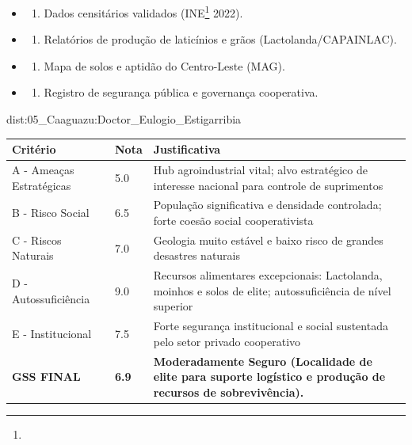 {\begin{itemize}
\tightlist
\item
  \begin{enumerate}
  \def\labelenumi{\arabic{enumi})}
  \tightlist
  \item
    Dados censitários validados (INE\footnote{\fineINE} 2022).
  \end{enumerate}
\item
  \begin{enumerate}
  \def\labelenumi{\arabic{enumi})}
  \setcounter{enumi}{1}
  \tightlist
  \item
    Relatórios de produção de laticínios e grãos (Lactolanda/\allowbreak CAPAINLAC).
  \end{enumerate}
\item
  \begin{enumerate}
  \def\labelenumi{\arabic{enumi})}
  \setcounter{enumi}{2}
  \tightlist
  \item
    Mapa de solos e aptidão do Centro-Leste (MAG).
  \end{enumerate}
\item
  \begin{enumerate}
  \def\labelenumi{\arabic{enumi})}
  \setcounter{enumi}{3}
  \tightlist
  \item
    Registro de segurança pública e governança cooperativa.
  \end{enumerate}
\end{itemize}}{dist:05_Caaguazu:Doctor_Eulogio_Estigarribia}
\begin{table}[ht!]
\small \begin{tabular}{p{3.0cm}p{0.8cm}p{6.0cm}} \toprule
\textbf{Critério} & \textbf{Nota} & \textbf{Justificativa} \\ \midrule
A - Ameaças Estratégicas & 5.0 & Hub agroindustrial vital; alvo estratégico de interesse nacional para controle de suprimentos \\
B - Risco Social & 6.5 & População significativa e densidade controlada; forte coesão social cooperativista \\
C - Riscos Naturais & 7.0 & Geologia muito estável e baixo risco de grandes desastres naturais \\
D - Autossuficiência & 9.0 & Recursos alimentares excepcionais: Lactolanda, moinhos e solos de elite; autossuficiência de nível superior \\
E - Institucional & 7.5 & Forte segurança institucional e social sustentada pelo setor privado cooperativo \\
\midrule \textbf{GSS FINAL} & \textbf{6.9} & \textbf{Moderadamente Seguro (Localidade de elite para suporte logístico e produção de recursos de sobrevivência).} \\ \bottomrule \end{tabular}
\end{table}
